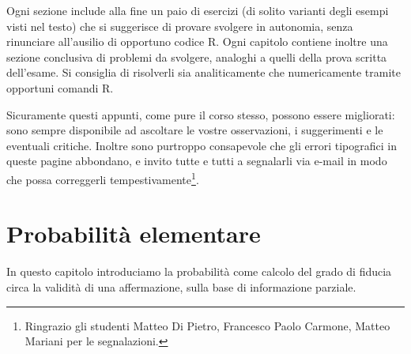 \documentclass[
  italian,
  letterpaper,
]{book}
\theoremstyle{definition}
\theoremstyle{remark}
\begin{document}
Ogni sezione include alla fine un paio di esercizi (di solito varianti
degli esempi visti nel testo) che si suggerisce di provare svolgere in
autonomia, senza rinunciare all'ausilio di opportuno codice R. Ogni
capitolo contiene inoltre una sezione conclusiva di problemi da
svolgere, analoghi a quelli della prova scritta dell'esame. Si consiglia
di risolverli sia analiticamente che numericamente tramite opportuni
comandi R.

Sicuramente questi appunti, come pure il corso stesso, possono essere
migliorati: sono sempre disponibile ad ascoltare le vostre osservazioni,
i suggerimenti e le eventuali critiche. Inoltre sono purtroppo
consapevole che gli errori tipografici in queste pagine abbondano, e
invito tutte e tutti a segnalarli via e-mail in modo che possa
correggerli tempestivamente\footnote{Ringrazio gli studenti Matteo Di
  Pietro, Francesco Paolo Carmone, Matteo Mariani per le segnalazioni.}.


\chapter{Probabilità elementare}\label{sec-intro-prob}

In questo capitolo introduciamo la probabilità come calcolo del grado di
fiducia circa la validità di una affermazione, sulla base di
informazione parziale.
\end{document}
